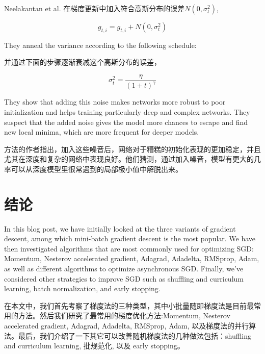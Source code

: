 \documentclass{article}
\begin{document}
Neelakantan et al. \cite{Neelakantan2015} 在梯度更新中加入符合高斯分布的误差$N(0, \sigma^2_t)$,

\begin{equation}
g_{t, i} = g_{t, i} + N(0, \sigma^2_t)
\end{equation}

They anneal the variance according to the following schedule:

并通过下面的步骤逐渐衰减这个高斯分布的误差，

\begin{equation}
\sigma^2_t = \frac{\eta}{(1 + t)^\gamma}
\end{equation}

They show that adding this noise makes networks more robust to poor initialization and helps training particularly deep and complex networks. They suspect that the added noise gives the model more chances to escape and find new local minima, which are more frequent for deeper models.

方法的作者指出，加入这些噪音后，网络对于糟糕的初始化表现的更加稳定，并且尤其在深度和复杂的网络中表现良好。他们猜测，通过加入噪音，模型有更大的几率可以从深度模型里很常遇到的局部极小值中解脱出来。

\section{结论}

In this blog post, we have initially looked at the three variants of gradient descent, among which mini-batch gradient descent is the most popular. We have then investigated algorithms that are most commonly used for optimizing SGD: Momentum, Nesterov accelerated gradient, Adagrad, Adadelta, RMSprop, Adam, as well as different algorithms to optimize asynchronous SGD. Finally, we've considered other strategies to improve SGD such as shuffling and curriculum learning, batch normalization, and early stopping.

在本文中，我们首先考察了梯度法的三种类型，其中小批量随即梯度法是目前最常用的方法。然后我们研究了最常用的梯度优化方法:Momentum, Nesterov accelerated gradient, Adagrad, Adadelta, RMSprop, Adam, 以及梯度法的并行算法。最后，我们介绍了一下其它可以改善随机梯度法的几种做法包括：shuffling and curriculum learning, 批规范化, 以及 early stopping。



\end{document}

